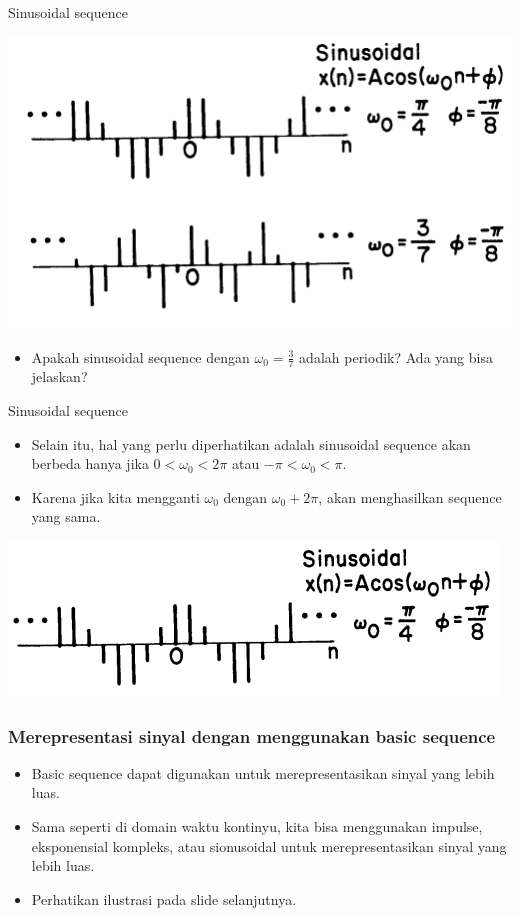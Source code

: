 \documentclass[pdflatex,compress]{beamer}
\begin{document}
\begin{frame}{Sinusoidal sequence}
	\begin{center}
		\includegraphics[width=0.8\linewidth]{img/img011}
	\end{center}
	\begin{itemize}
		\item Apakah sinusoidal sequence dengan $ \omega_0 = \frac{3}{7} $ adalah periodik? Ada yang bisa jelaskan?
	\end{itemize}
\end{frame}

\begin{frame}{Sinusoidal sequence}
		\begin{itemize}
		\item Selain itu, hal yang perlu diperhatikan adalah sinusoidal sequence akan berbeda hanya jika $0 < \omega_0 < 2\pi $ atau $ -\pi < \omega_0 < \pi $.
		\item Karena jika kita mengganti $ \omega_0 $ dengan $ \omega_0 + 2\pi $, akan menghasilkan sequence yang sama.
	\end{itemize}
	\begin{center}
		\includegraphics[width=0.8\linewidth]{img/img010}
	\end{center}
\end{frame}

\begin{frame}
	\frametitle{Merepresentasi sinyal dengan menggunakan basic sequence}
	\begin{itemize}
		\item Basic sequence dapat digunakan untuk merepresentasikan sinyal yang lebih luas.
		\item Sama seperti di domain waktu kontinyu, kita bisa menggunakan impulse, eksponensial kompleks, atau sionusoidal untuk merepresentasikan sinyal yang lebih luas.
		\item Perhatikan ilustrasi pada slide selanjutnya.
	\end{itemize}
\end{frame}
\end{document}
